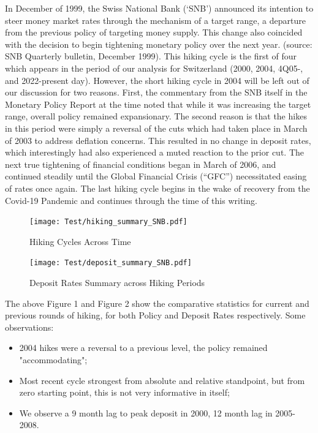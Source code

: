 \documentclass{article}
\begin{document}
In December of 1999, the Swiss National Bank (‘SNB’) announced its intention to steer money market rates through the mechanism of a target range, a departure from the previous policy of targeting money supply. This change also coincided with the decision to begin tightening monetary policy over the next year. (source: SNB Quarterly bulletin, December 1999). This hiking cycle is the first of four which appears in the period of our analysis for Switzerland (2000, 2004, 4Q05-, and 2022-present day). However, the short hiking cycle in 2004 will be left out of our discussion for two reasons. First, the commentary from the SNB itself in the Monetary Policy Report at the time noted that while it was increasing the target range, overall policy remained expansionary. The second reason is that the hikes in this period were simply a reversal of the cuts which had taken place in March of 2003 to address deflation concerns. This resulted in no change in deposit rates, which interestingly had also experienced a muted reaction to the prior cut. The next true tightening of financial conditions began in March of 2006, and continued steadily until the Global Financial Crisis (“GFC”) necessitated easing of rates once again. The last hiking cycle begins in the wake of recovery from the Covid-19 Pandemic and continues through the time of this writing.\\ 


\begin{figure}[h]
    \centering
    \texttt{[image: Test/hiking\_summary\_SNB.pdf]}
    \caption{Hiking Cycles Across Time}
    \label{fig:your_pdf}
\end{figure}

\begin{figure}[h]
    \centering
    \texttt{[image: Test/deposit\_summary\_SNB.pdf]}
    \caption{Deposit Rates Summary across Hiking Periods}
    \label{fig:deposit_summary}
\end{figure}


The above Figure 1 and Figure 2 show the comparative statistics for current and previous rounds of hiking, for both Policy and Deposit Rates respectively. Some observations:

\begin{itemize}
    \item 2004 hikes were a reversal to a previous level, the policy remained "accommodating";
    \item Most recent cycle strongest from absolute and relative standpoint, but from zero starting point, this is not very informative in itself;
    \item We observe a 9 month lag to peak deposit in 2000, 12 month lag in 2005-2008. 
\end{itemize}
\end{document}
